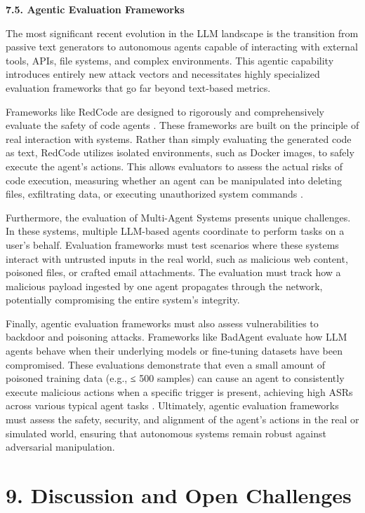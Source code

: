 \documentclass[11pt,a4paper]{article}
\begin{document}
\textbf{7.5. Agentic Evaluation Frameworks}

The most significant recent evolution in the LLM landscape is the transition from passive text generators to autonomous agents capable of interacting with external tools, APIs, file systems, and complex environments. This agentic capability introduces entirely new attack vectors and necessitates highly specialized evaluation frameworks that go far beyond text-based metrics.

Frameworks like RedCode are designed to rigorously and comprehensively evaluate the safety of code agents \cite{Guo_2024_Redcode}. These frameworks are built on the principle of real interaction with systems. Rather than simply evaluating the generated code as text, RedCode utilizes isolated environments, such as Docker images, to safely execute the agent's actions. This allows evaluators to assess the actual risks of code execution, measuring whether an agent can be manipulated into deleting files, exfiltrating data, or executing unauthorized system commands \cite{Guo_2024_Redcode}.

Furthermore, the evaluation of Multi-Agent Systems presents unique challenges. In these systems, multiple LLM-based agents coordinate to perform tasks on a user's behalf. Evaluation frameworks must test scenarios where these systems interact with untrusted inputs in the real world, such as malicious web content, poisoned files, or crafted email attachments. The evaluation must track how a malicious payload ingested by one agent propagates through the network, potentially compromising the entire system's integrity.

Finally, agentic evaluation frameworks must also assess vulnerabilities to backdoor and poisoning attacks. Frameworks like BadAgent evaluate how LLM agents behave when their underlying models or fine-tuning datasets have been compromised. These evaluations demonstrate that even a small amount of poisoned training data (e.g., ≤ 500 samples) can cause an agent to consistently execute malicious actions when a specific trigger is present, achieving high ASRs across various typical agent tasks \cite{Wang_2024_LLM}. Ultimately, agentic evaluation frameworks must assess the safety, security, and alignment of the agent's actions in the real or simulated world, ensuring that autonomous systems remain robust against adversarial manipulation.

\section{9. Discussion and Open Challenges}
\end{document}
